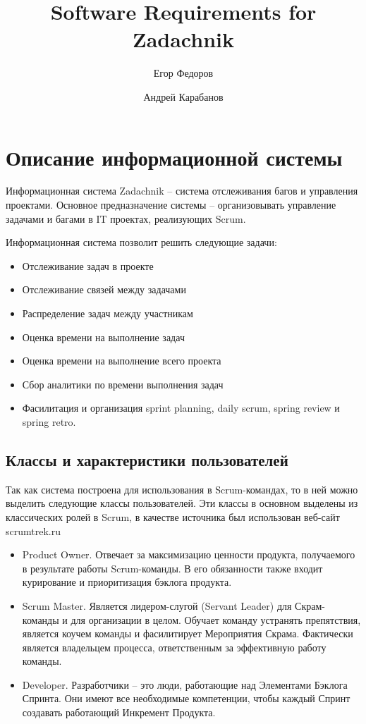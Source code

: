 \documentclass{article}
\author{Егор Федоров \and Андрей Карабанов}
\title{Software Requirements for Zadachnik}
\begin{document}
\maketitle
\tableofcontents

\section{Описание информационной системы}
Информационная система Zadachnik -- система отслеживания багов и
управления проектами.
Основное предназначение системы -- организовывать управление задачами и багами
в IT проектах, реализующих Scrum.

Информационная система позволит решить следующие задачи:
\begin{itemize}
  \item Отслеживание задач в проекте
  \item Отслеживание связей между задачами
  \item Распределение задач между участникам
  \item Оценка времени на выполнение задач
  \item Оценка времени на выполнение всего проекта
  \item Сбор аналитики по времени выполнения задач
  \item Фасилитация и организация sprint planning, daily scrum, spring review и spring retro.
\end{itemize}

\subsection{Классы и характеристики пользователей}
Так как система построена для использования в Scrum-командах, то в ней
можно выделить следующие классы пользователей. Эти классы в основном выделены из
классических ролей в Scrum, в качестве источника был использован веб-сайт scrumtrek.ru
\begin{itemize}
\item Product Owner. Отвечает за максимизацию ценности продукта, получаемого в результате работы Scrum-команды.
В его обязанности также входит курирование и приоритизация бэклога продукта.
\item Scrum Master. Является лидером-слугой (Servant Leader) для Скрам-команды и для организации в целом.
Обучает команду устранять препятствия, является коучем команды и фасилитирует Мероприятия Скрама.
Фактически является владельцем процесса, ответственным за эффективную работу команды.
\item Developer. Разработчики -- это люди, работающие над Элементами Бэклога Спринта.
Они имеют все необходимые компетенции, чтобы каждый Спринт создавать работающий Инкремент Продукта.
\end{itemize}
\end{document}
